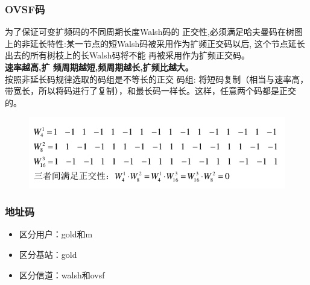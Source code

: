 \subsubsection{OVSF码}
为了保证可变扩频码的不同周期长度Walsh码的
正交性,必须满足哈夫曼码在树图上的非延长特性:某一节点的短Walsh码被采用作为扩频正交码以后,
这个节点延长出去的所有树枝上的长Walsh码将不能
再被采用作为扩频正交码。\\
\textbf{速率越高,扩
	频周期越短,频周期越长,扩频比越大。
}\\
按照非延长码规律选取的码组是不等长的正交
码组:
将短码复制（相当与速率高，带宽长，所以将码进行了复制），和最长码一样长。这样，任意两个码都是正交的。
\begin{figure}[H]
	\centering
	\includegraphics[width=0.7\linewidth]{figures/OVSP}
	\caption{}
	\label{fig:ovsp}
\end{figure}
\subsubsection{地址码}
\begin{itemize}
	\item 区分用户：gold和m
	\item 区分基站：gold
	\item 区分信道：walsh和ovsf
\end{itemize}
